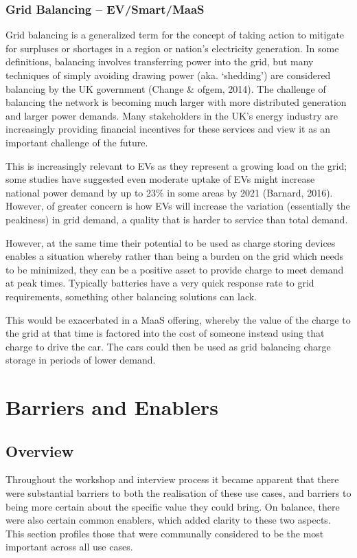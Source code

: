 \documentclass[journal]{IEEEtran}
\begin{document}
\subsubsection{Grid Balancing -- EV/Smart/MaaS} 

Grid balancing is a generalized term for the concept of taking action
to mitigate for surpluses or shortages in a region or nation’s
electricity generation. In some definitions, balancing involves
transferring power into the grid, but many techniques of simply
avoiding drawing power (aka. `shedding') are considered balancing by
the UK government (Change \& ofgem, 2014). The challenge of balancing
the network is becoming much larger with more distributed generation
and larger power demands. Many stakeholders in the UK’s energy
industry are increasingly providing financial incentives for these
services and view it as an important challenge of the future.

This is increasingly relevant to EVs as they represent a growing load
on the grid; some studies have suggested even moderate uptake of EVs
might increase national power demand by up to 23\% in some areas by
2021 (Barnard, 2016). However, of greater concern is how EVs will
increase the variation (essentially the peakiness) in grid demand, a
quality that is harder to service than total demand.

However, at the same time their potential to be used as charge storing
devices enables a situation whereby rather than being a burden on the
grid which needs to be minimized, they can be a positive asset to
provide charge to meet demand at peak times. Typically batteries have
a very quick response rate to grid requirements, something other
balancing solutions can lack.

This would be exacerbated in a MaaS offering, whereby the value of the
charge to the grid at that time is factored into the cost of someone
instead using that charge to drive the car. The cars could then be
used as grid balancing charge storage in periods of lower demand.


\section{Barriers and Enablers}\label{barriersenablers}

\subsection{Overview}

Throughout the workshop and interview process it became apparent that
there were substantial barriers to both the realisation of these use
cases, and barriers to being more certain about the specific value
they could bring. On balance, there were also certain common enablers,
which added clarity to these two aspects.  This section profiles those
that were communally considered to be the most important across all
use cases.
\end{document}
